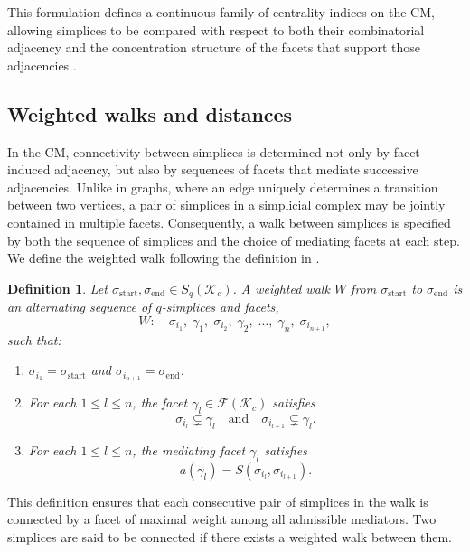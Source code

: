 \documentclass[12pt]{article}
\theoremstyle{normalhead_nobrackets}
\newtheorem{definition}{Definition}[section]
\theoremstyle{exampstyle}
\begin{document}
This formulation defines a continuous family of centrality indices on the CM, allowing simplices to be compared with respect to both their combinatorial adjacency and the concentration structure of the facets that support those adjacencies \cite{wei2012degree, yustiawan2015degree}.

\subsection{Weighted walks and distances}

In the CM, connectivity between simplices is determined not only by facet-induced adjacency, but also by sequences of facets that mediate successive adjacencies. Unlike in graphs, where an edge uniquely determines a transition between two vertices, a pair of simplices in a simplicial complex may be jointly contained in multiple facets. Consequently, a walk between simplices is specified by both the sequence of simplices and the choice of mediating facets at each step. We define the weighted walk following the definition in \cite{raj2025study}.

\begin{definition}
Let $\sigma_{\mathrm{start}}, \sigma_{\mathrm{end}} \in S_q(\mathcal{K}_c)$. A {weighted walk} $W$ from $\sigma_{\mathrm{start}}$ to $\sigma_{\mathrm{end}}$ is an alternating sequence of $q$-simplices and facets,
\[
W:\quad \sigma_{i_1},\; \gamma_1,\; \sigma_{i_2},\; \gamma_2,\; \dots,\; \gamma_n,\; \sigma_{i_{n+1}},
\]
such that:
\begin{enumerate}
    \item[(i)] $\sigma_{i_1} = \sigma_{\mathrm{start}}$ and $\sigma_{i_{n+1}} = \sigma_{\mathrm{end}}$.
    \item[(ii)] For each $1 \leq l \leq n$, the facet $\gamma_l \in \mathcal{F}(\mathcal{K}_c)$ satisfies
    \[
    \sigma_{i_l} \subsetneq \gamma_l
    \quad \text{and} \quad
    \sigma_{i_{l+1}} \subsetneq \gamma_l.
    \]
    \item[(iii)] For each $1 \leq l \leq n$, the mediating facet $\gamma_l$ satisfies
    \[
    a(\gamma_l) = S(\sigma_{i_l}, \sigma_{i_{l+1}}).
    \]
\end{enumerate}
\end{definition}

This definition ensures that each consecutive pair of simplices in the walk is connected by a facet of maximal weight among all admissible mediators. Two simplices are said to be {connected} if there exists a weighted walk between them.
\end{document}
